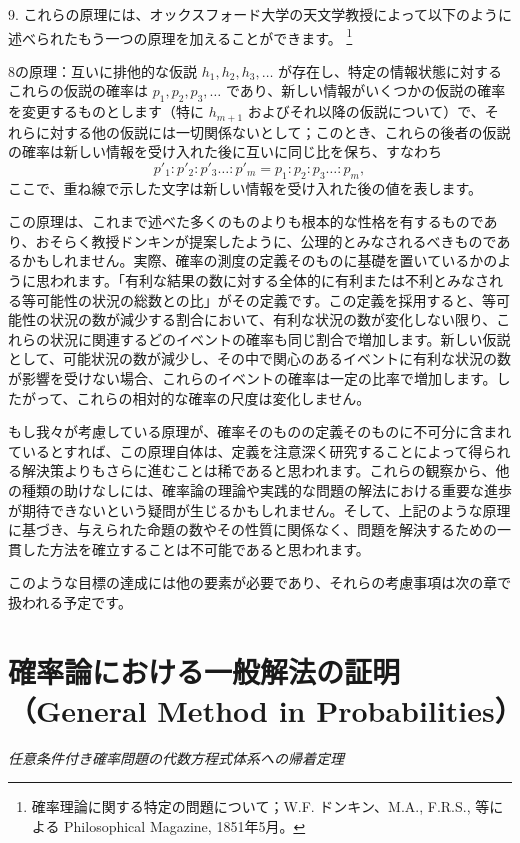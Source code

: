 \documentclass[a4paper,11pt,openany]{ltjsbook}
\begin{document}
9. これらの原理には、オックスフォード大学の天文学教授によって以下のように述べられたもう一つの原理を加えることができます。
\footnote{確率理論に関する特定の問題について；W.F. ドンキン、M.A., F.R.S., 等による Philosophical Magazine, 1851年5月。}

8の原理：互いに排他的な仮説 $h_1, h_2, h_3, \dotsc$ が存在し、特定の情報状態に対するこれらの仮説の確率は $p_1, p_2, p_3, \dotsc$ であり、新しい情報がいくつかの仮説の確率を変更するものとします（特に $h_{m+1}$ およびそれ以降の仮説について）で、それらに対する他の仮説には一切関係ないとして；このとき、これらの後者の仮説の確率は新しい情報を受け入れた後に互いに同じ比を保ち、すなわち
\[
  p'_1 : p'_2 : p'_3 \ldots : p'_m = p_1 : p_2 : p_3 \ldots : p_m,
\]
ここで、重ね線で示した文字は新しい情報を受け入れた後の値を表します。

この原理は、これまで述べた多くのものよりも根本的な性格を有するものであり、おそらく教授ドンキンが提案したように、公理的とみなされるべきものであるかもしれません。実際、確率の測度の定義そのものに基礎を置いているかのように思われます。「有利な結果の数に対する全体的に有利または不利とみなされる等可能性の状況の総数との比」がその定義です。この定義を採用すると、等可能性の状況の数が減少する割合において、有利な状況の数が変化しない限り、これらの状況に関連するどのイベントの確率も同じ割合で増加します。新しい仮説として、可能状況の数が減少し、その中で関心のあるイベントに有利な状況の数が影響を受けない場合、これらのイベントの確率は一定の比率で増加します。したがって、これらの相対的な確率の尺度は変化しません。

もし我々が考慮している原理が、確率そのものの定義そのものに不可分に含まれているとすれば、この原理自体は、定義を注意深く研究することによって得られる解決策よりもさらに進むことは稀であると思われます。これらの観察から、他の種類の助けなしには、確率論の理論や実践的な問題の解法における重要な進歩が期待できないという疑問が生じるかもしれません。そして、上記のような原理に基づき、与えられた命題の数やその性質に関係なく、問題を解決するための一貫した方法を確立することは不可能であると思われます。

このような目標の達成には他の要素が必要であり、それらの考慮事項は次の章で扱われる予定です。

\newpage

\chapter{確率論における一般解法の証明（General Method in Probabilities）}
\label{ch:xvii}

\begin{center}
\large\textit{任意条件付き確率問題の代数方程式体系への帰着定理}
\end{center}
\vspace{4mm}
\end{document}
